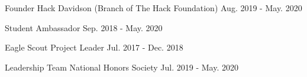 

\begin{cventries}

  \cventryleadership
    {Founder} %
    {Hack Davidson (Branch of The Hack Foundation)} %
    {} %
    {Aug. 2019 - May. 2020} %
    {}

\cventryleadership
{} %
{Student Ambassador} %
{} %
{Sep. 2018 - May. 2020} %
{}

\cventryleadership
{} %
{Eagle Scout Project Leader} %
{} %
{Jul. 2017 - Dec. 2018} %
{}

\cventryleadership
{Leadership Team} %
{National Honors Society} %
{} %
{Jul. 2019 - May. 2020} %
{}

\end{cventries}
